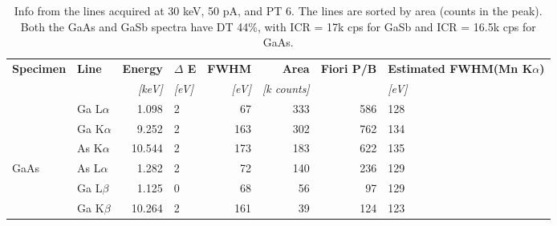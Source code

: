 \begin{table}[phtb]
    \begin{center}
        \caption{
            Info from the lines acquired at 30 keV, 50 pA, and PT 6.
            The lines are sorted by area (counts in the peak).
            Both the GaAs and GaSb spectra have DT 44\%, with ICR = 17k cps for GaSb and ICR = 16.5k cps for GaAs.
        }
        \renewcommand*{\arraystretch}{1.4}
        \label{tab:results:lines_info_30kV_50pA}
        \begin{tabular}{llrlrrrp{2.5cm}}
            \hline
            \textbf{Specimen} & \textbf{Line} & \textbf{Energy} & \textbf{$\Delta$ E} & \textbf{FWHM} & \textbf{Area}     & \textbf{Fiori P/B} & \textbf{Estimated FWHM(Mn K$\alpha$)} \\
                              &               & \emph{[keV]}    & \emph{[eV]}         & \emph{[eV]}   & \emph{[k counts]} &                    & \emph{[eV]}                           \\
            \hline
                              & Ga L$\alpha$  & 1.098           & 2                   & 67            & 333               & 586                & 128                                   \\
                              & Ga K$\alpha$  & 9.252           & 2                   & 163           & 302               & 762                & 134                                   \\
                              & As K$\alpha$  & 10.544          & 2                   & 173           & 183               & 622                & 135                                   \\
            GaAs              & As L$\alpha$  & 1.282           & 2                   & 72            & 140               & 236                & 129                                   \\
                              & Ga L$\beta$   & 1.125           & 0                   & 68            & 56                & 97                 & 129                                   \\
                              & Ga K$\beta$   & 10.264          & 2                   & 161           & 39                & 124                & 123                                   \\

\end{tabular}
\end{center}
\end{table}
